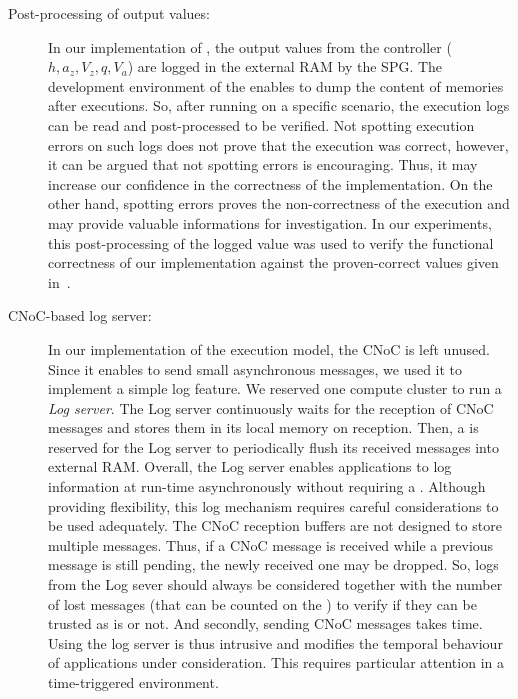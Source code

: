 \documentclass[main.tex]{subfiles}
\begin{document}
\begin{description}
    \item[Post-processing of output values: ] In our implementation of \rosace, the output values from the controller ($h , a_z , V_z , q , V_a$) are logged in the external RAM by the SPG. The development environment of the \mppalong enables to dump the content of memories after executions. So, after running \rosace on a specific scenario, the execution logs can be read and post-processed to be verified. Not spotting execution errors on such logs does not prove that the execution was correct, however, it can be argued that not spotting errors is encouraging. Thus, it may increase our confidence in the correctness of the implementation. On the other hand, spotting errors proves the non-correctness of the execution and may provide valuable informations for investigation. In our experiments, this post-processing of the logged value was used to verify the functional correctness of our \rosace implementation against the proven-correct values given in~\cite{Pagetti2014}.
    \item[CNoC-based log server: ] In our implementation of the execution model, the CNoC is left unused. Since it enables to send small asynchronous messages, we used it to implement a simple log feature. We reserved one compute cluster to run a \emph{Log server}. The Log server continuously waits for the reception of CNoC messages and stores them in its local memory on reception. Then, a \PC{} is reserved for the Log server to periodically flush its received messages into external RAM. Overall, the Log server enables applications to log information at run-time asynchronously without requiring a \PC{}.  
        Although providing flexibility, this log mechanism requires careful considerations to be used adequately. The CNoC reception buffers are not designed to store multiple messages. Thus, if a CNoC message is received while a previous message is still pending, the newly received one may be dropped. So, logs from the Log sever should always be considered together with the number of lost messages (that can be counted on the \mppalong) to verify if they can be trusted as is or not. And secondly, sending CNoC messages takes time. Using the log server is thus intrusive and modifies the temporal behaviour of applications under consideration. This requires particular attention in a time-triggered environment.

\end{description}
\end{document}
